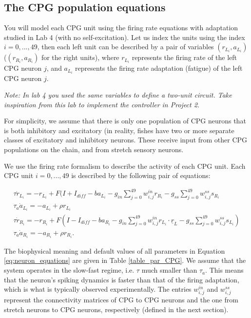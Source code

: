 \documentclass{cmc}
\begin{document}
\subsection*{The CPG population equations}

You will model each CPG unit using the firing rate equations with adaptation studied in Lab 4 (with no self-excitation). Let us index the units using the index $i=0,...,49$, then each left unit can be described by a pair of variables $(r_{L_i}, a_{L_i})$ ($(r_{R_i}, a_{R_i})$ for the right units), where $r_{L_i}$ represents the firing rate of the left CPG neuron $j$, and $a_{L_i}$ represents the firing rate adaptation (fatigue) of the left CPG neuron $j$.

\textit{Note: In lab 4 you used the same variables to define a two-unit circuit. Take inspiration from this lab to implement the controller in Project 2.
}

For simplicity, we assume that there is only one population of CPG neurons that is both inhibitory and excitatory (in reality, fishes have two or more separate classes of excitatory and inhibitory neurons. These receive input from other CPG populations on the chain, and from stretch sensory neurons.

We use the firing rate formalism to describe the activity of each CPG unit. Each CPG unit $i=0,...,49$ is described by the following pair of equations:

\begin{equation}
    \begin{array}{lcl}
	\tau \dot{r}_{L_i} = -r_{L_i} + F(I+I_{diff}-b a_{L_i} - g_{in} \sum_{j=0}^{49} w^{in}_{i,j} r_{R_i}  - g_{ss} \sum_{j=0}^{49} w^{ss}_{i,j} s_{R_i} \\
	\tau_a \dot{a}_{L_i} = -a_{L_i} + \rho r_{L_i} \\
	\tau \dot{r}_{R_i} = -r_{R_i} + F(I-I_{diff}-b a_{R_i} - g_{in} \sum_{j=0}^{49} w^{in}_{i,j} r_{L_i} \cdot \underline{r}_L - g_{ss} \sum_{j=0}^{49} w^{ss}_{i,j} s_{L_i} ) \\
	\tau_a \dot{a}_{R_i} = -a_{R_i} + \rho r_{R_i}.
    \end{array}
	\label{eq:neuron_equations}
\end{equation}

The biophysical meaning and default values of all parameters in Equation \ref{eq:neuron_equations} are given in Table \ref{table_par_CPG}. We assume that the system operates in the slow-fast regime, i.e. $\tau$ much smaller than $\tau_a$. This means that the neuron's spiking dynamics is faster than that of the firing adaptation, which is what is typically observed experimentally. The entries $w^{in}_{i,j}$ and $w^{ss}_{i,j}$ represent the connectivity matrices of CPG to CPG neurons and the one from stretch neurons to CPG neurons, respectively (defined in the next section).
\end{document}

